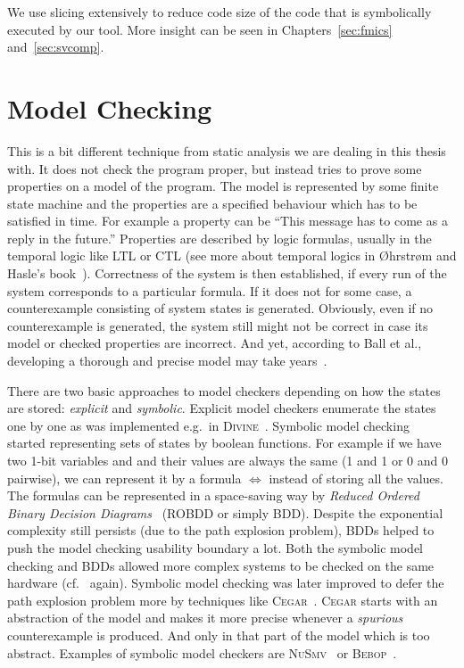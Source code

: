 We use slicing extensively to reduce code size of the code that is
symbolically executed by our tool. More insight can be seen in
Chapters~\ref{sec:fmics} and~\ref{sec:svcomp}.

\section{Model Checking}
This is a bit different technique from static analysis we are dealing in this
thesis with. It does not check the program proper, but instead tries to prove
some properties on a model of the program. The model is represented by some
finite state machine and the properties are a specified behaviour which has to
be satisfied in time. For example a property can be ``This message has to come
as a reply in the future.'' Properties are described by logic formulas,
usually in the temporal logic like LTL or CTL (see more about temporal logics
in {\O}hrstr{\o}m and Hasle's book~\cite{temporal}). Correctness of the system
is then established, if every run of the system corresponds to a particular
formula. If it does not for some case, a counterexample consisting of system
states is generated. Obviously, even if no counterexample is generated, the
system still might not be correct in case its model or checked properties are
incorrect. And yet, according to Ball et al., developing a thorough and
precise model may take years~\cite{mc_years}.

There are two basic approaches to model checkers depending on how the states
are stored: \emph{explicit} and \emph{symbolic}. Explicit model checkers
enumerate the states one by one as was implemented e.g.\ in
\textsc{Divine}~\cite{divine}. Symbolic model
checking~\cite{mc_symbolic1,mc_symbolic2} started representing sets of states
by boolean functions. For example if we have two 1-bit variables  and
 and their values are always the same (1 and 1 or 0 and 0 pairwise),
we can represent it by a formula  $\Leftrightarrow$  instead
of storing all the values. The formulas can be represented in a space-saving
way by \emph{Reduced Ordered Binary Decision Diagrams}~\cite{bdd} (ROBDD or
simply BDD).  Despite the exponential complexity still persists (due to the
path explosion problem), BDDs helped to push the model checking usability
boundary a lot.  Both the symbolic model checking and BDDs allowed more
complex systems to be checked on the same hardware (cf.~\cite{mc_symbolic1}
again).  Symbolic model checking was later improved to defer the path
explosion problem more by techniques like \textsc{Cegar}~\cite{cegar}.
\textsc{Cegar} starts with an abstraction of the model and makes it more
precise whenever a \emph{spurious} counterexample is produced.  And only in
that part of the model which is too abstract. Examples of symbolic model
checkers are \textsc{NuSmv}~\cite{nusmv} or \textsc{Bebop}~\cite{bebop}.

